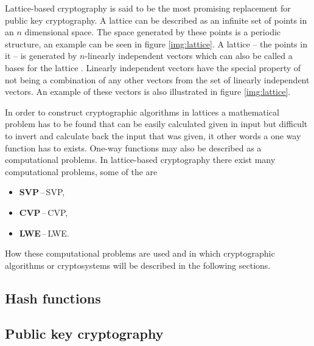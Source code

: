 Lattice-based cryptography is said to be the most promising replacement for public key cryptography. A lattice can be described as an infinite set of points in an $n$ dimensional space. The space generated by these points is a periodic structure, an example can be seen in figure \ref{img:lattice}. A lattice -- the points in it -- is generated by $n$-linearly independent vectors which can also be called a bases for the lattice \cite{Bernstein2009}. Linearly independent vectors have the special property of not being a combination of any other vectors from the set of linearly independent vectors. An example of these vectors is also illustrated in figure \ref{img:lattice}.


In order to construct cryptographic algorithms in lattices a mathematical problem has to be found that can be easily calculated given in input but difficult to invert and calculate back the input that was given, it other words a one way function has to exists. One-way functions may also be described as a computational problems. In lattice-based cryptography there exist many computational problems, some of the are
\begin{itemize}
  \item \textbf{SVP}\,--\,\acl{SVP},
  \item \textbf{CVP}\,--\,\acl{CVP},
  \item \textbf{LWE}\,--\,\acl{LWE}\cite{Bernstein2009}.
\end{itemize}
How these computational problems are used and in which cryptographic algorithms or cryptosystems will be described in the following sections.

\subsection{Hash functions}

\subsection{Public key cryptography}
